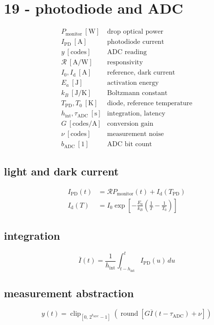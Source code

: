 \section*{19 - photodiode and ADC}

\[
\begin{array}{ll}P_{\mathrm{monitor}}\ [\mathrm W]&\text{drop optical power}\\[0.6em]I_{\mathrm{PD}}\ [\mathrm A]&\text{photodiode current}\\[0.6em]y\ [\mathrm{codes}]&\text{ADC reading}\\[0.6em]\mathcal R\ [\mathrm{A/W}]&\text{responsivity}\\[0.6em]I_0,I_{\mathrm d}\ [\mathrm A]&\text{reference, dark current}\\[0.6em]E_a\ [\mathrm J]&\text{activation energy}\\[0.6em]k_B\ [\mathrm{J/K}]&\text{Boltzmann constant}\\[0.6em]T_{\mathrm{PD}},T_0\ [\mathrm K]&\text{diode, reference temperature}\\[0.6em]h_{\mathrm{int}},\tau_{\mathrm{ADC}}\ [\mathrm s]&\text{integration, latency}\\[0.6em]G\ [\mathrm{codes/A}]&\text{conversion gain}\\[0.6em]\nu\ [\mathrm{codes}]&\text{measurement noise}\\[0.6em]b_{\mathrm{ADC}}\ [1]&\text{ADC bit count}\end{array}
\]

\subsection*{light and dark current}
\[
\displaystyle \begin{aligned}I_{\mathrm{PD}}(t)&=\mathcal R P_{\mathrm{monitor}}(t)+I_{\mathrm d}(T_{\mathrm{PD}})\\I_{\mathrm d}(T)&=I_0\exp\!\left[-\frac{E_a}{k_B}\left(\frac1T-\frac1{T_0}\right)\right]\end{aligned}
\]

\subsection*{integration}
\[
\displaystyle \overline I(t)=\frac1{h_{\mathrm{int}}}\int_{t-h_{\mathrm{int}}}^{t}I_{\mathrm{PD}}(u)\,du
\]

\subsection*{measurement abstraction}
\[
\displaystyle y(t)=\operatorname{clip}_{[0,\,2^{b_{\mathrm{ADC}}}-1]}\!\left(\operatorname{round}\!\left[G\overline I(t-\tau_{\mathrm{ADC}})+\nu\right]\right)
\]

